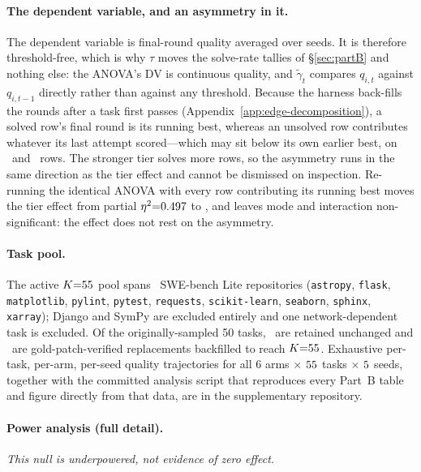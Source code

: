 \paragraph{The dependent variable, and an asymmetry in it.} The dependent variable is final-round quality averaged over seeds. It is therefore threshold-free, which is why $\tau$ moves the solve-rate tallies of \S\ref{sec:partB} and nothing else: the ANOVA's DV is continuous quality, and $\tilde\gamma_t$ compares $q_{i,t}$ against $q_{i,t-1}$ directly rather than against any threshold. Because the harness back-fills the rounds after a task first passes (Appendix~\ref{app:edge-decomposition}), a solved row's final round is its running best, whereas an unsolved row contributes whatever its last attempt scored---which may sit below its own earlier best, on \statPBHaikuRegressRows\ and \statPBSonnetRegressRows\ rows. The stronger tier solves more rows, so the asymmetry runs in the same direction as the tier effect and cannot be dismissed on inspection. Re-running the identical ANOVA with every row contributing its running best moves the tier effect from partial $\eta^2{=}0.497$ to \statPBModelEtaRunningBest, and leaves mode and interaction non-significant: the effect does not rest on the asymmetry.

\paragraph{Task pool.} The active $K{=}55$ pool spans \statPBTaskPoolRepos\ SWE-bench Lite repositories (\texttt{astropy}, \texttt{flask}, \texttt{matplotlib}, \texttt{pylint}, \texttt{pytest}, \texttt{requests}, \texttt{scikit-learn}, \texttt{seaborn}, \texttt{sphinx}, \texttt{xarray}); Django and SymPy are excluded entirely and one network-dependent task is excluded. Of the originally-sampled 50 tasks, \statPBTaskPoolRetained\ are retained unchanged and \statPBTaskPoolBackfilled\ are gold-patch-verified replacements backfilled to reach $K{=}55$. Exhaustive per-task, per-arm, per-seed quality trajectories for all $6$ arms $\times$ $55$ tasks $\times$ $5$ seeds, together with the committed analysis script that reproduces every Part~B table and figure directly from that data, are in the supplementary repository.

\paragraph{Power analysis (full detail).} \emph{This null is underpowered, not evidence of zero effect.}

